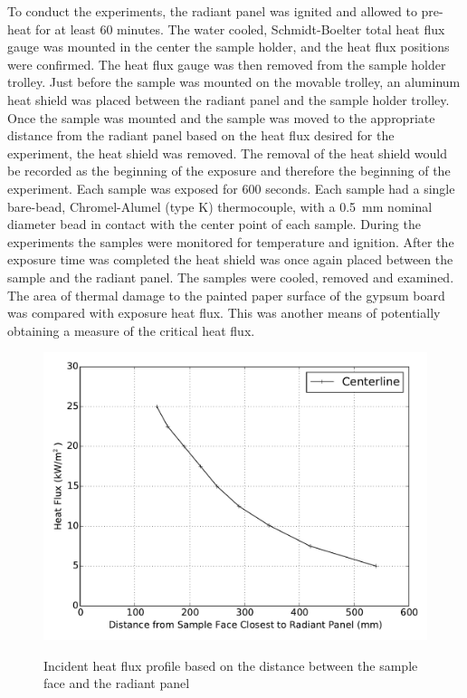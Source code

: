 \documentclass[twoside]{uocthesis}
\begin{document}
To conduct the experiments, the radiant panel was ignited and allowed to pre-heat for at least 60 minutes.  The water cooled, Schmidt-Boelter total heat flux gauge was mounted in the center the sample holder, and the heat flux positions were confirmed. The heat flux gauge was then removed from the sample holder trolley. Just before the sample was mounted on the movable trolley, an aluminum heat shield was placed between the radiant panel and the sample holder trolley.  Once the sample was mounted and the sample was moved to the appropriate distance from the radiant panel based on the heat flux desired for the experiment, the heat shield was removed.  The removal of the heat shield would be recorded as the beginning of the exposure and therefore the beginning of the experiment.   Each sample was exposed for 600 seconds. Each sample had a single bare-bead, Chromel-Alumel (type K) thermocouple, with a 0.5~mm nominal diameter bead in contact with the center point of each sample. During the experiments the samples were monitored for temperature and ignition. After the exposure time was completed the heat shield was once again placed between the sample and the radiant panel.  The samples were cooled, removed and examined.  The area of thermal damage to the painted paper surface of the gypsum board was compared with exposure heat flux.  This was another means of potentially obtaining a measure of the critical heat flux.  


\begin{figure}
	\centering
	\includegraphics[width=\textwidth]{../Figures/Rad_Panel_Cal} \\
	\caption[Incident heat flux profile based on the distance between the sample face and the radiant panel]{Incident heat flux profile based on the distance between the sample face and the radiant panel}
	\label{Rad_Panel_Cal}
\end{figure}
\end{document}
